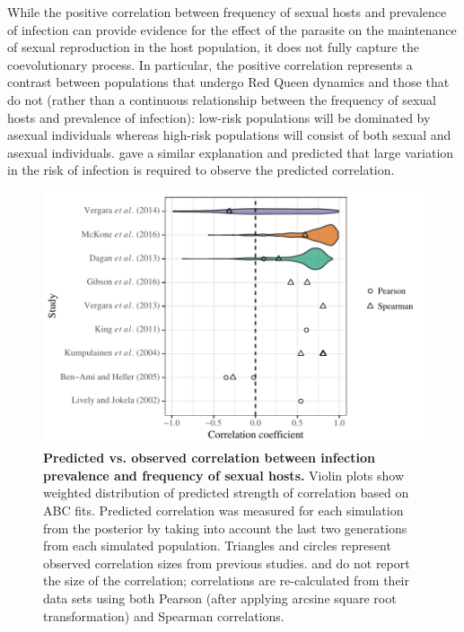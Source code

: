 \documentclass{article}\usepackage[]{graphicx}\usepackage[]{color}
\begin{document}
While the positive correlation between frequency of sexual hosts and prevalence of infection can provide evidence for the effect of the parasite on the maintenance of sexual reproduction in the host population, it does not fully capture the coevolutionary process.
In particular, the positive correlation represents a contrast between populations that undergo Red Queen dynamics and those that do not (rather than a continuous relationship between the frequency of sexual hosts and prevalence of infection):
low-risk populations will be dominated by asexual individuals whereas high-risk populations will consist of both sexual and asexual individuals.
\cite{lively2001trematode} gave a similar explanation and predicted that large variation in the risk of infection is required to observe the predicted correlation.

\begin{figure}[!ht]
\includegraphics[width=\textwidth]{../fig/effect_size.pdf}
\caption{{\bf Predicted vs. observed correlation between infection prevalence and frequency of sexual hosts.}
Violin plots show weighted distribution of predicted strength of correlation based on ABC fits.
Predicted correlation was measured for each simulation from the posterior by taking into account the last two generations from each simulated population.
Triangles and circles represent observed correlation sizes from previous studies.
\cite{dagan2013clonal} and \cite{vergara2014infection} do not report the size of the correlation; correlations are re-calculated from their data sets using both Pearson (after applying arcsine square root transformation) and Spearman correlations.
}
\label{fig:effect}
\end{figure}
\end{document}
